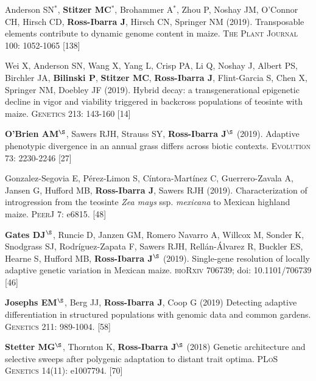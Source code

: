 \documentclass[letterpaper,10pt]{article}
\begin{document}
\begin{etaremune}
\item  Anderson SN$^*$, \textbf{Stitzer MC}$^*$,  Brohammer A$^*$, Zhou P, Noshay JM,  O'Connor CH, Hirsch CD, \textbf{Ross-Ibarra J}, Hirsch CN, Springer NM (2019). Transposable elements contribute to dynamic genome content in maize. \textsc{The Plant Journal} 100: 1052-1065
{} [138]\\

\item Wei X,  Anderson SN,  Wang X,  Yang L, Crisp PA,  Li Q,  Noshay J, Albert PS, Birchler JA,  \textbf{Bilinski P}, \textbf{Stitzer MC}, \textbf{Ross-Ibarra J},  Flint-Garcia S,  Chen X,  Springer NM, Doebley JF (2019). Hybrid decay: a transgenerational epigenetic decline in vigor and viability triggered in backcross populations of teosinte with maize. \textsc{Genetics} 213: 143-160
{} [14]\\

\item \textbf{O'Brien AM}$^\S$, Sawers RJH, Strauss SY, \textbf{Ross-Ibarra J}$^\S$ (2019). Adaptive phenotypic divergence in an annual grass differs across biotic contexts. \textsc{Evolution} 73: 2230-2246
{} [27]\\

\item  Gonzalez-Segovia E,  P\'erez-Limon S,  C\'intora-Mart\'inez C,  Guerrero-Zavala A,  Jansen G,  Hufford MB, \textbf{Ross-Ibarra J}, Sawers RJH (2019). Characterization of introgression from the teosinte \textit{Zea mays} ssp. \textit{mexicana} to Mexican highland maize. \textsc{PeerJ} 7: e6815. %
{} [48]\\

\item \textbf{Gates DJ}$^\S$, Runcie D, Janzen GM, Romero Navarro A,  Willcox M,  Sonder K, Snodgrass SJ, Rodr\'{i}guez-Zapata F,  Sawers RJH,  Rell\'{a}n-\'{A}lvarez R, Buckler ES, Hearne S, Hufford MB, \textbf{Ross-Ibarra J}$^\S$ (2019). Single-gene resolution of locally adaptive genetic variation in Mexican maize. \textsc{bioRxiv} 706739; doi: 10.1101/706739
{} [46]\\

\item \textbf{Josephs EM}$^\S$, Berg JJ, \textbf{Ross-Ibarra J}, Coop G (2019) Detecting adaptive differentiation in structured populations with genomic data and common gardens. \textsc{Genetics} 211: 989-1004.
{} [58]\\

\item \textbf{Stetter MG}$^\S$, Thornton K, \textbf{Ross-Ibarra J}$^\S$ (2018) Genetic architecture and selective sweeps after polygenic adaptation to distant trait optima. \textsc{PLoS Genetics} 14(11): e1007794. %
{} [70]\\


\end{etaremune}
\end{document}
